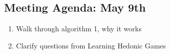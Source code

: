 \documentclass[a4paper]{article}
\begin{document}
\subsection*{Meeting Agenda: May 9th}

\begin{enumerate}
  \item Walk through algorithm 1, why it works
  \item Clarify questions from Learning Hedonic Games \cite{ijcai2017-380}
\end{enumerate}

\end{document}
